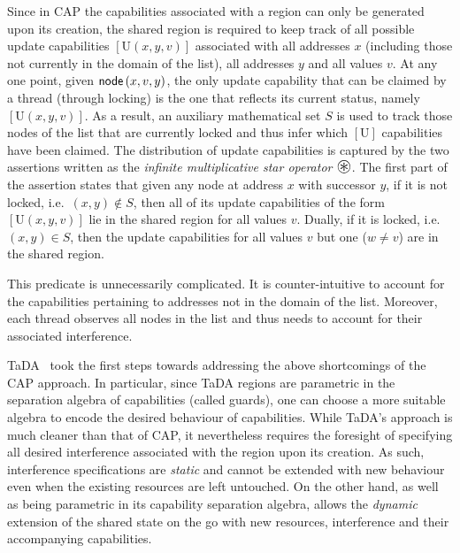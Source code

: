 Since in CAP the capabilities associated with a region can only be generated upon its creation, the shared region is required to keep track of all possible update capabilities $[\text{U}(x, y, v)]$ associated with all addresses $x$ (including those not currently in the domain of the list), all addresses $y$ and all values $v$. At any one point, given $\textsf{node}\left(x, v, y\right)$, the only update capability that can be claimed by a thread (through locking) is the one that reflects its current status, namely $[\text{U}(x, y, v)]$. As a result, an auxiliary mathematical set $S$ is used to track those nodes of the list that are currently locked and thus infer which $[\text{U}]$ capabilities have been claimed. The distribution of update capabilities is captured by the two assertions written as the \emph{infinite multiplicative star operator} $\iterStar$. The first part of the assertion states that given any node at address $x$ with successor $y$, if it is not locked, i.e.\ $(x, y) \not\in S$, then {all} of its update capabilities of the form $[\text{U}(x, y, v)]$ lie in the shared region for {all} values $v$. Dually, if it is locked, i.e.\ $(x, y) \in S$, then the update capabilities for {all} values $v$ {but one} ($w \not= v$) are in the shared region.

This predicate is unnecessarily complicated. It is counter-intuitive to account for the capabilities pertaining to addresses not in the domain of the list. Moreover, each thread observes all nodes in the list and thus needs to account for their associated interference. 

TaDA~\cite{tada} took the first steps towards addressing the above shortcomings of the CAP approach. In particular, since TaDA regions are parametric in the separation algebra of capabilities (called guards), one can choose a more suitable algebra to encode the desired behaviour of capabilities. 
While TaDA's approach is much cleaner than that of CAP, it nevertheless requires the foresight of specifying all desired interference associated with the region upon its creation. 
As such, interference specifications are \emph{static} and cannot be extended with new behaviour even when the existing resources are left untouched. 
On the other hand, as well as being parametric in its capability separation algebra, \colosl allows the \emph{dynamic} extension of the shared state on the go with new resources, interference and their accompanying capabilities.
%

